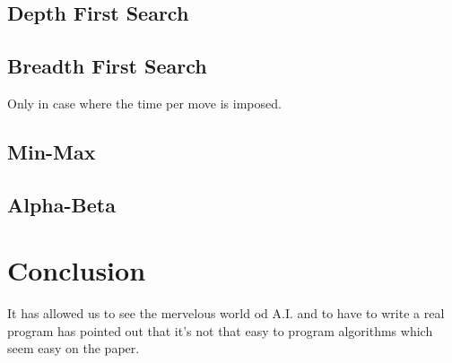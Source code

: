 \documentclass{book}
\begin{document}
\section{Depth First Search}
\section{Breadth First Search}
Only in case where the time per move is imposed.
\section{Min-Max}
\section{Alpha-Beta}



\chapter{Conclusion}
It has allowed us to see the mervelous world od A.I. and to have to write a real program has pointed out that it's not that easy to program algorithms which seem easy on the paper.
\end{document}
